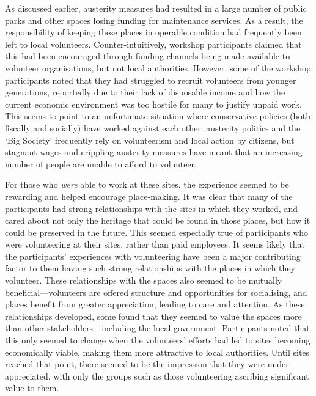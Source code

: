 As discussed earlier, austerity measures had resulted in a large number of public parks and other spaces losing funding for maintenance services. As a result, the responsibility of keeping these places in operable condition had frequently been left to local volunteers. Counter-intuitively, workshop participants claimed that this had been encouraged through funding channels being made available to volunteer organisations, but not local authorities. However, some of the workshop participants noted that they had struggled to recruit volunteers from younger generations, reportedly due to their lack of disposable income and how the current economic environment was too hostile for many to justify unpaid work. This seems to point to an unfortunate situation where conservative policies (both fiscally and socially) have worked against each other: austerity politics and the `Big Society' frequently rely on volunteerism and local action by citizens, but stagnant wages and crippling austerity measures have meant that an increasing number of people are unable to afford to volunteer.

For those who \textit{were} able to work at these sites, the experience seemed to be rewarding and helped encourage place-making. It was clear that many of the participants had strong relationships with the sites in which they worked, and cared about not only the heritage that could be found in those places, but how it could be preserved in the future. This seemed especially true of participants who were volunteering at their sites, rather than paid employees. It seems likely that the participants' experiences with volunteering have been a major contributing factor to them having such strong relationships with the places in which they volunteer. These relationships with the spaces also seemed to be mutually beneficial---volunteers are offered structure and opportunities for socialising, and places benefit from greater appreciation, leading to care and attention. As these relationships developed, some found that they seemed to value the spaces more than other stakeholders---including the local government. Participants noted that this only seemed to change when the volunteers' efforts had led to sites becoming economically viable, making them more attractive to local authorities. Until sites reached that point, there seemed to be the impression that they were under-appreciated, with only the groups such as those volunteering ascribing significant value to them.

